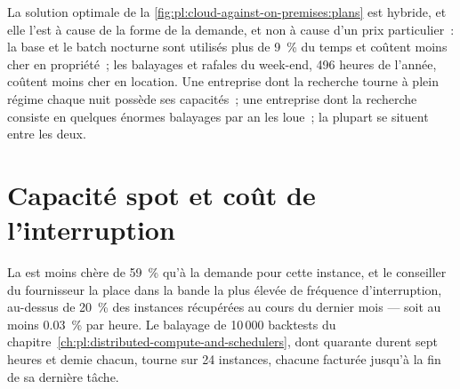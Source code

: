 La solution optimale de la \cref{fig:pl:cloud-against-on-premises:plans} est hybride, et elle l'est à cause de la forme de la demande, et non à cause d'un
prix particulier~: la base et le batch nocturne sont utilisés plus de 9~\% du temps et coûtent moins cher en propriété~; les balayages et rafales du week-end, 496 heures
de l'année, coûtent moins cher en location. Une entreprise dont la recherche tourne à plein régime chaque nuit possède ses capacités~; une entreprise dont la recherche consiste en quelques énormes balayages par an
les loue~; la plupart se situent entre les deux.

\section{Capacité spot et coût de l'interruption}

La  est moins chère de 59~\% qu'à la demande pour cette instance, et le conseiller du fournisseur la place dans la bande la plus élevée de fréquence
d'interruption, au-dessus de 20~\% des instances récupérées au cours du dernier mois --- soit au moins 0.03~\% par heure. Le balayage de 10\,000 backtests
du chapitre~\ref{ch:pl:distributed-compute-and-schedulers}, dont quarante durent sept heures et demie chacun, tourne sur 24 instances, chacune facturée jusqu'à la fin de sa dernière tâche.

\label{lst:pl:cloud-against-on-premises:ckpt}

